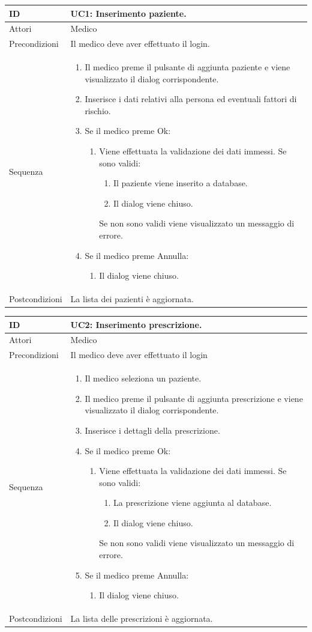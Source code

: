 \documentclass[a4paper, 11pt]{article}
\newcommand{\usecase}[5]{%
\begin{table}[H]
	\centering
	\renewcommand{\familydefault}{\ttdefault}\normalfont
\begin{tabular}{| >{\fontseries{b}\selectfont} p{0.2\textwidth} | L |}
	\hline
	ID&{#1}\\\hline
	Attori&{#2}\\\hline
	Precondizioni&{#3}\\\hline
	Sequenza&{#4}\\\hline
	Postcondizioni&{#5}\\\hline
\end{tabular}
\end{table}

}
\begin{document}
\usecase{UC1: Inserimento paziente.}
{Medico}
{Il medico deve aver effettuato il login.}
{%
	\begin{enumerate}[label*=\arabic*., nosep]
		\item Il medico preme il pulsante di aggiunta paziente e viene visualizzato il dialog corrispondente.
		\item Inserisce i dati relativi alla persona ed eventuali fattori di rischio.
		\item Se il medico preme Ok:
		\begin{enumerate}[label*=\arabic*., nosep]
			\item Viene effettuata la validazione dei dati immessi. Se sono validi:
			\begin{enumerate}[label*=\arabic*., nosep]
				\item Il paziente viene inserito a database.
				\item Il dialog viene chiuso.
			\end{enumerate}
			Se non sono validi viene visualizzato un messaggio di errore.
		\end{enumerate}
		\item Se il medico preme Annulla:
		\begin{enumerate}[label*=\arabic*., nosep]
			\item Il dialog viene chiuso.
		\end{enumerate}
	\end{enumerate}}
{La lista dei pazienti è aggiornata.}

\usecase{UC2: Inserimento prescrizione.}
{Medico}
{Il medico deve aver effettuato il login}
{%
	\begin{enumerate}[label*=\arabic*., nosep]
		\item Il medico seleziona un paziente.
		\item Il medico preme il pulsante di aggiunta prescrizione e viene visualizzato il dialog corrispondente.
		\item Inserisce i dettagli della prescrizione.
		\item Se il medico preme Ok:
		\begin{enumerate}[label*=\arabic*., nosep]
			\item Viene effettuata la validazione dei dati immessi. Se sono validi:
			\begin{enumerate}[label*=\arabic*., nosep]
				\item La prescrizione viene aggiunta al database.
				\item Il dialog viene chiuso.
			\end{enumerate}
			Se non sono validi viene visualizzato un messaggio di errore.
		\end{enumerate}
		\item Se il medico preme Annulla:
		\begin{enumerate}[label*=\arabic*., nosep]
			\item Il dialog viene chiuso.
		\end{enumerate}
\end{enumerate}}
{La lista delle prescrizioni è aggiornata.}
\end{document}
